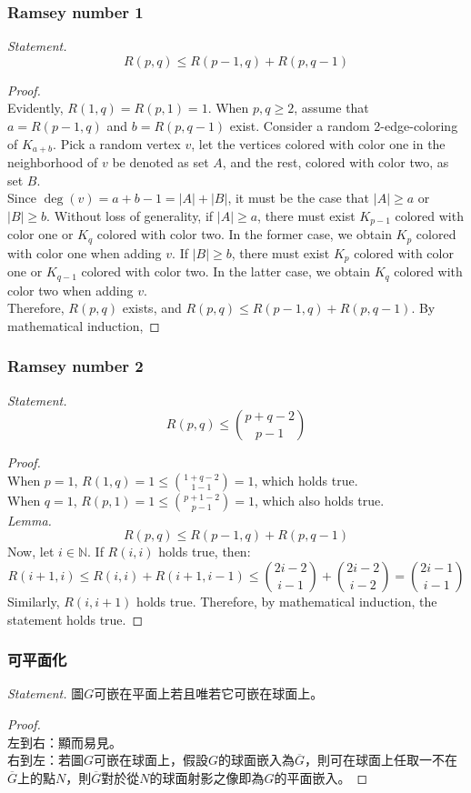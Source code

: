\documentclass[a4paper,12pt]{report}
\begin{document}
\subsubsection{Ramsey number 1}
\textit{Statement. }\[ R(p, q) \leq R(p - 1, q) + R(p, q - 1) \]
\begin{proof}\mbox{}\\
Evidently, \(R(1, q) = R(p, 1) = 1\). When \(p, q \geq 2\), assume that \(a = R(p - 1, q)\) and \(b = R(p, q - 1)\) exist. Consider a random 2-edge-coloring of \(K_{a+b}\). Pick a random vertex \(v\), let the vertices colored with color one in the neighborhood of \(v\) be denoted as set \(A\), and the rest, colored with color two, as set \(B\). \\
Since \( \deg(v) = a + b - 1 = |A| + |B| \), it must be the case that \(|A| \geq a\) or \(|B| \geq b\). Without loss of generality, if \(|A| \geq a\), there must exist \(K_{p-1}\) colored with color one or \(K_q\) colored with color two. In the former case, we obtain \(K_p\) colored with color one when adding \(v\). If \(|B| \geq b\), there must exist \(K_p\) colored with color one or \(K_{q-1}\) colored with color two. In the latter case, we obtain \(K_q\) colored with color two when adding \(v\). \\
Therefore, \(R(p, q)\) exists, and \(R(p, q) \leq R(p - 1, q) + R(p, q - 1)\). By mathematical induction,
\end{proof}
\subsubsection{Ramsey number 2}
\textit{Statement. }\[ R(p, q) \leq \binom{p+q-2}{p-1} \]
\begin{proof}\mbox{}\\
When \( p = 1 \), \( R(1, q) = 1 \leq \binom{1+q-2}{1-1} = 1 \), which holds true. \\
When \( q = 1 \), \( R(p, 1) = 1 \leq \binom{p+1-2}{p-1} = 1 \), which also holds true. \\
\textit{Lemma. }
\[ R(p, q) \leq R(p - 1, q) + R(p, q - 1) \]
Now, let \( i \in \mathbb{N} \). If \( R(i, i) \) holds true, then:
\[ R(i + 1, i) \leq R(i, i) + R(i + 1, i - 1) \leq \binom{2i-2}{i-1} + \binom{2i-2}{i-2} = \binom{2i-1}{i-1} \]
Similarly, \( R(i, i + 1) \) holds true. Therefore, by mathematical induction, the statement holds true.
\end{proof}
\subsubsection{可平面化}
\textit{Statement. }圖$G$可嵌在平面上若且唯若它可嵌在球面上。
\begin{proof}\mbox{}\\
左到右：顯而易見。 \\
右到左：若圖$G$可嵌在球面上，假設$G$的球面嵌入為$\overline{G}$，則可在球面上任取一不在$\overline{G}$上的點$N$，則$\overline{G}$對於從$N$的球面射影之像即為$G$的平面嵌入。
\end{proof}
\end{document}
